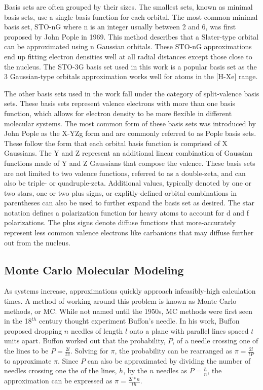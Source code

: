 Basis sets are often grouped by their sizes.
The smallest sets, known as minimal basis sets, use a single basis function for each orbital. 
The most common minimal basis set, STO-nG where n is an integer usually between 2 and 6, was first proposed by John Pople in 1969.\cite{PopleSTO}
This method describes that a Slater-type orbital can be approximated using n Gaussian orbitals.
These STO-nG approximations end up fitting electron densities well at all radial distances except those close to the nucleus.
The STO-3G basis set used in this work is a popular basis set as the 3 Gaussian-type orbitals approximation works well for atoms in the [H-Xe] range.

The other basis sets used in the work fall under the category of split-valence basis sets.
These basis sets represent valence electrons with more than one basis function, which allows for electron density to be more flexible in different molecular systems.
The most common form of these basis sets was introduced by John Pople as the X-YZg form and are commonly referred to as Pople basis sets.\cite{PopleBS}
These follow the form that each orbital basis function is comprised of X Gaussians.
The Y and Z represent an additional linear combination of Gaussian functions made of Y and Z Gaussians  that compose the valence. 
These basis sets are not limited to two valence functions, referred to as a double-zeta, and can also be triple- or quadruple-zeta.
Additional values, typically denoted by one or two stars, one or two plus signs, or explitly-defined orbital combinations in parentheses can also be used to further expand the basis set as desired.
The star notation defines a polarization function for heavy atoms to account for d and f polarizations.
The plus signs denote diffuse functions that more-accurately represent less common valence electrons like carbanions that may diffuse further out from the nucleus.

\subsection{Monte Carlo Molecular Modeling}

As systems increase, approximations quickly approach infeasibly-high calculation times.
A method of working around this problem is known as Monte Carlo methods, or MC.
While not named until the 1950s, MC methods were first seen in the 18$^{th}$ century thought experiment Buffon's needle.\cite{buffon}
In his work, Buffon proposed dropping $n$ needles of length $l$ onto a plane with parallel lines spaced $t$ units apart.
Buffon worked out that the probability, $P$, of a needle crossing one of the lines to be $P=\frac{2l}{t\pi}$.
Solving for $\pi$, the probability can be rearranged as $\pi=\frac{2l}{tP}$ to approximate $\pi$.
Since $P$ can also be approximated by dividing the number of needles crossing one the of the lines, $h$, by the $n$ needles as $P=\frac{h}{n}$, the approximation can be expressed as $\pi=\frac{2l*n}{th}$.

